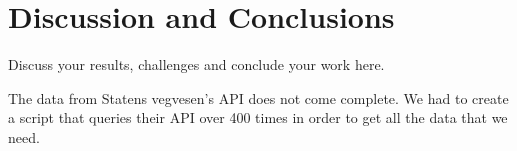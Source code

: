 \chapter{Discussion and Conclusions}

Discuss your results, challenges and conclude your work here.

The data from Statens vegvesen's API \cite{statensvegvesen} does not come complete. We had to create a script that queries their API over 400 times in order to get all the data that we need.
